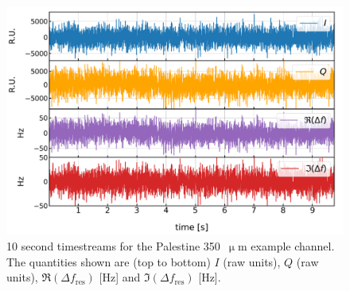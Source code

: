 \begin{figure}[!htbp]
\centering
\includegraphics[width=\textwidth]{figures/blast_data/timestreams/350_pal_ts_and_df_448}
\caption[~10 second timestreams for the Palestine 350~ example channel.]{10 second timestreams for the Palestine 350~$\upmu$m example channel. The quantities shown are (top to bottom) $I$ (raw units), $Q$ (raw units), $\Re(\Delta f_{\mathrm{res}})$ [Hz] and $\Im(\Delta f_{\mathrm{res}})$ [Hz].}
\label{fig:timestreams}
\end{figure}

